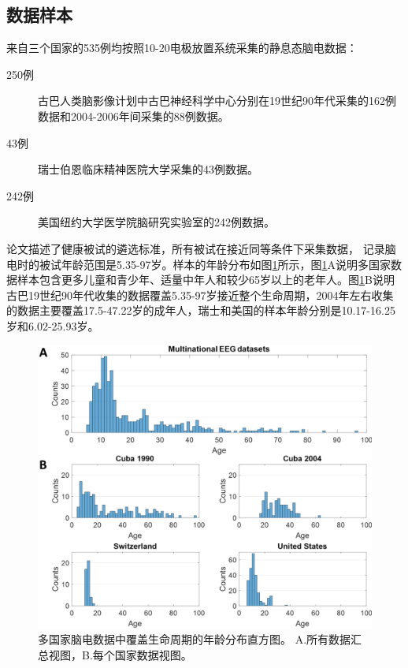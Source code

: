 \subsection{数据样本}
来自三个国家的535例均按照10-20电极放置系统采集的静息态脑电数据：
\begin{description}
\item[250例] 古巴人类脑影像计划中古巴神经科学中心分别在19世纪90年代采集的162例数据和2004-2006年间采集的88例数据。
\item[43例] 瑞士伯恩临床精神医院大学采集的43例数据。
\item[242例] 美国纽约大学医学院脑研究实验室的242例数据。
\end{description}
论文描述了健康被试的遴选标准，所有被试在接近同等条件下采集数据，
记录脑电时的被试年龄范围是5.35-97岁。样本的年龄分布如图\ref{6:age}所示，图\ref{6:age}A说明多国家数据样本包含更多儿童和青少年、适量中年人和较少65岁以上的老年人。图\ref{6:age}B说明古巴19世纪90年代收集的数据覆盖5.35-97岁接近整个生命周期，2004年左右收集的数据主要覆盖17.5-47.22岁的成年人，瑞士和美国的样本年龄分别是10.17-16.25岁和6.02-25.93岁。
\begin{figure}[!ht]
\includegraphics[width=15cm]{pic/Norm/figure1.png}
\caption{多国家脑电数据中覆盖生命周期的年龄分布直方图。 A.所有数据汇总视图，B.每个国家数据视图。}
\label{6:age}
\end{figure}

